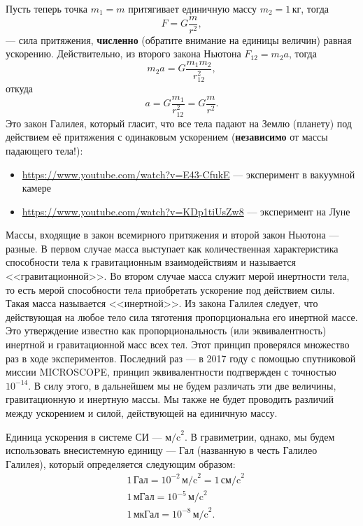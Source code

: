 \documentclass[11pt, a4paper]{article}
\theoremstyle{plain}
\theoremstyle{definition}
\theoremstyle{remark}
\begin{document}
Пусть теперь точка $m_1 = m$ притягивает единичную массу $m_2 = 1\,\text{кг}$, тогда
\begin{equation}
    F = G\dfrac{m}{r^2},
    \label{eq:dynamic}
\end{equation}
--- сила притяжения, \textbf{численно} (обратите внимание на единицы величин) равная ускорению.
Действительно, из второго закона Ньютона $F_{12} = m_2 a$, тогда
\begin{equation*}
    m_2 a = G\dfrac{m_1m_2}{r_{12}^2},
\end{equation*}
откуда 
\begin{equation}
    a = G\dfrac{m_1}{r_{12}^2} = G\dfrac{m}{r^2}.
    \label{eq:kinematic}
\end{equation}
Это закон Галилея, который гласит, что все тела падают на Землю (планету) под действием 
 её притяжения с одинаковым ускорением (\textbf{независимо} от массы падающего тела!):
\begin{itemize}
    \item \url{https://www.youtube.com/watch?v=E43-CfukE} --- эксперимент в вакуумной камере
    \item \url{https://www.youtube.com/watch?v=KDp1tiUsZw8} --- эксперимент на Луне
\end{itemize}
Массы, входящие в закон всемирного притяжения и второй закон Ньютона --- разные. В первом случае
масса выступает как количественная характеристика  способности тела к гравитационным
взаимодействиям и называется <<гравитационной>>. Во втором случае масса служит мерой инертности
тела, то есть мерой способности тела приобретать ускорение под действием силы. Такая масса
называется <<инертной>>. Из закона Галилея 
следует, что действующая  на  любое  тело  сила  тяготения  пропорциональна  его  инертной  массе.  Это
утверждение известно как пропорциональность (или эквивалентность) инертной и гравитационной масс
всех тел. Этот принцип проверялся множество раз в ходе экспериментов. Последний раз --- в 2017 году
с помощью спутниковой миссии MICROSCOPE, принцип эквивалентности подтвержден с точностью $10^{-14}$.
В силу этого, в дальнейшем мы не будем различать эти две величины, гравитационную и инертную массы.
Мы также не будет проводить различий между ускорением и силой, действующей на единичную массу.

Единица ускорения в системе СИ --- $\text{м/c}^2$. В гравиметрии, однако, мы будем
использовать внесистемную единицу --- Гал (названную в честь Галилео Галилея), который определяется
следующим образом:
\begin{align*}
    &1\,\text{Гал} = 10^{-2}\,\text{м/c}^2 = 1\,\text{см/c}^2\\
    &1\,\text{мГал} = 10^{-5}\,\text{м/c}^2 \\
    &1\,\text{мкГал} = 10^{-8}\,\text{м/c}^2. 
\end{align*}
\end{document}
